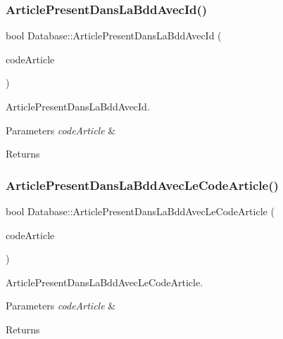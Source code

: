 \subsubsection{\texorpdfstring{Article\+Present\+Dans\+La\+Bdd\+Avec\+Id()}{ArticlePresentDansLaBddAvecId()}}
{\footnotesize\ttfamily bool Database\+::\+Article\+Present\+Dans\+La\+Bdd\+Avec\+Id (\begin{DoxyParamCaption}\item[{Q\+String}]{code\+Article }\end{DoxyParamCaption})}



Article\+Present\+Dans\+La\+Bdd\+Avec\+Id. 


\begin{DoxyParams}{Parameters}
{\em code\+Article} & \\
\hline
\end{DoxyParams}
\begin{DoxyReturn}{Returns}

\end{DoxyReturn}
\mbox{\label{class_database_a5965471d637e973abba80f63f6aecb8d}} 
\subsubsection{\texorpdfstring{Article\+Present\+Dans\+La\+Bdd\+Avec\+Le\+Code\+Article()}{ArticlePresentDansLaBddAvecLeCodeArticle()}}
{\footnotesize\ttfamily bool Database\+::\+Article\+Present\+Dans\+La\+Bdd\+Avec\+Le\+Code\+Article (\begin{DoxyParamCaption}\item[{Q\+String}]{code\+Article }\end{DoxyParamCaption})}



Article\+Present\+Dans\+La\+Bdd\+Avec\+Le\+Code\+Article. 


\begin{DoxyParams}{Parameters}
{\em code\+Article} & \\
\hline
\end{DoxyParams}
\begin{DoxyReturn}{Returns}

\end{DoxyReturn}
\mbox{\label{class_database_a83a103a11c2b982427ffae7eb11ea167}} 
